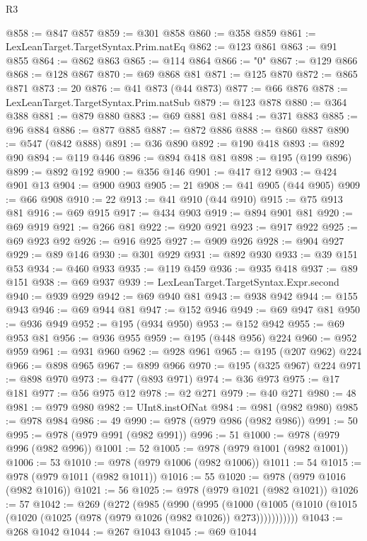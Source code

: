 \begin{lexlean}{R3}
\begin{coremodule}
@858 := @847 @857
@859 := @301 @858
@860 := @358 @859
@861 := LexLeanTarget.TargetSyntax.Prim.natEq
@862 := @123 @861
@863 := @91 @855
@864 := @862 @863
@865 := @114 @864
@866 := "0"
@867 := @129 @866
@868 := @128 @867
@870 := @69 @868 @81
@871 := @125 @870
@872 := @865 @871
@873 := 20
@876 := @41 @873 (@44 @873)
@877 := @66 @876
@878 := LexLeanTarget.TargetSyntax.Prim.natSub
@879 := @123 @878
@880 := @364 @388
@881 := @879 @880
@883 := @69 @881 @81
@884 := @371 @883
@885 := @96 @884
@886 := @877 @885
@887 := @872 @886
@888 := @860 @887
@890 := @547 (@842 @888)
@891 := @36 @890
@892 := @190 @418
@893 := @892 @90
@894 := @119 @446
@896 := @894 @418 @81
@898 := @195 (@199 @896)
@899 := @892 @192
@900 := @356 @146
@901 := @417 @12
@903 := @424 @901 @13
@904 := @900 @903
@905 := 21
@908 := @41 @905 (@44 @905)
@909 := @66 @908
@910 := 22
@913 := @41 @910 (@44 @910)
@915 := @75 @913 @81
@916 := @69 @915
@917 := @434 @903
@919 := @894 @901 @81
@920 := @69 @919
@921 := @266 @81
@922 := @920 @921
@923 := @917 @922
@925 := @69 @923 @92
@926 := @916 @925
@927 := @909 @926
@928 := @904 @927
@929 := @89 @146
@930 := @301 @929
@931 := @892 @930
@933 := @39 @151 @53
@934 := @460 @933
@935 := @119 @459
@936 := @935 @418
@937 := @89 @151
@938 := @69 @937
@939 := LexLeanTarget.TargetSyntax.Expr.second
@940 := @939 @929
@942 := @69 @940 @81
@943 := @938 @942
@944 := @155 @943
@946 := @69 @944 @81
@947 := @152 @946
@949 := @69 @947 @81
@950 := @936 @949
@952 := @195 (@934 @950)
@953 := @152 @942
@955 := @69 @953 @81
@956 := @936 @955
@959 := @195 (@448 @956) @224
@960 := @952 @959
@961 := @931 @960
@962 := @928 @961
@965 := @195 (@207 @962) @224
@966 := @898 @965
@967 := @899 @966
@970 := @195 (@325 @967) @224
@971 := @898 @970
@973 := @477 (@893 @971)
@974 := @36 @973
@975 := @17 @181
@977 := @56 @975 @12
@978 := @2 @271
@979 := @40 @271
@980 := 48
@981 := @979 @980
@982 := UInt8.instOfNat
@984 := @981 (@982 @980)
@985 := @978 @984
@986 := 49
@990 := @978 (@979 @986 (@982 @986))
@991 := 50
@995 := @978 (@979 @991 (@982 @991))
@996 := 51
@1000 := @978 (@979 @996 (@982 @996))
@1001 := 52
@1005 := @978 (@979 @1001 (@982 @1001))
@1006 := 53
@1010 := @978 (@979 @1006 (@982 @1006))
@1011 := 54
@1015 := @978 (@979 @1011 (@982 @1011))
@1016 := 55
@1020 := @978 (@979 @1016 (@982 @1016))
@1021 := 56
@1025 := @978 (@979 @1021 (@982 @1021))
@1026 := 57
@1042 := @269
    (@272
      (@985
        (@990
          (@995
            (@1000
              (@1005 (@1010 (@1015 (@1020 (@1025 (@978 (@979 @1026 (@982 @1026)) @273)))))))))))
@1043 := @268 @1042
@1044 := @267 @1043
@1045 := @69 @1044

\end{coremodule}
\end{lexlean}
